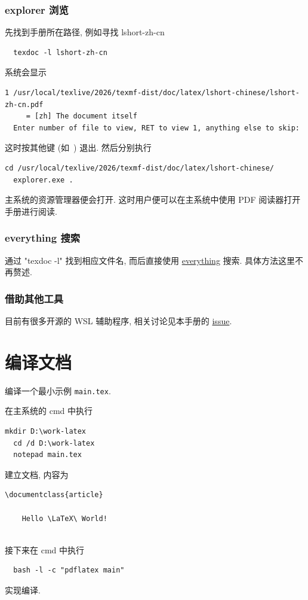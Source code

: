 \subsubsection{explorer 浏览}

先找到手册所在路径,
例如寻找 \textsf{lshort-zh-cn}
\begin{lstlisting}
  texdoc -l lshort-zh-cn
\end{lstlisting}
系统会显示
\begin{lstlisting}[language = {}]
   1 /usr/local/texlive/2026/texmf-dist/doc/latex/lshort-chinese/lshort-zh-cn.pdf
     = [zh] The document itself
  Enter number of file to view, RET to view 1, anything else to skip:
\end{lstlisting}
这时按其他键 (如\ ) 退出.
然后分别执行
\begin{lstlisting}[language = {}]
  cd /usr/local/texlive/2026/texmf-dist/doc/latex/lshort-chinese/
  explorer.exe .
\end{lstlisting}
主系统的资源管理器便会打开.
这时用户便可以在主系统中使用 PDF 阅读器打开手册进行阅读.

\subsubsection{everything 搜索}

通过 "texdoc -l" 找到相应文件名,
而后直接使用 \href{https://www.voidtools.com/zh-cn/}{everything} 搜索.
具体方法这里不再赘述.

\subsubsection{借助其他工具}

目前有很多开源的 WSL 辅助程序,
相关讨论见本手册的 \href{https://github.com/OsbertWang/install-latex-guide-zh-cn/issues/13}{issue}.

\section{编译文档}

编译一个最小示例 \texttt{main.tex}.

在主系统的 \textsf{cmd} 中执行
\begin{lstlisting}[deletekeywords = tex]
  mkdir D:\work-latex
  cd /d D:\work-latex
  notepad main.tex
\end{lstlisting}
建立文档,
内容为
\begin{lstlisting}[language = mwe]
  \documentclass{article}
  
    Hello \LaTeX\ World!
  
\end{lstlisting}
接下来在 \textsf{cmd} 中执行
\begin{lstlisting}
  bash -l -c "pdflatex main"
\end{lstlisting}
实现编译.

